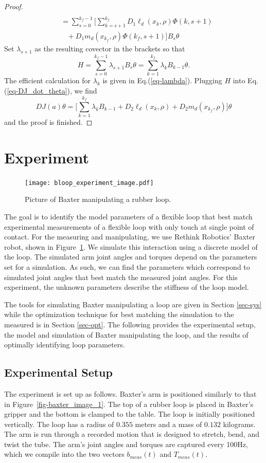 \documentclass[letterpaper, 10pt, conference]{ieeeconf}
\begin{document}
\begin{proof}
\[\begin{array}{l}
\\\hspace{10pt} = \sum_{s=0}^{k_f-1}\Big[\sum_{k = s+1}^{k_f}D_1\ell_d(x_k,\rho) \Phi(k,s+1) \\\hspace{20pt}+ D_1m_d(x_{k_f},\rho)\Phi(k_f,s+1)\Big]B_s\theta
\end{array}
\]
Set $\lambda_{s+1}$ as the resulting covector in the brackets so that 
\[
H = \sum_{s=0}^{k_f-1} \lambda_{s+1} B_s\theta = \sum_{k=1}^{k_f} \lambda_{k} B_{k-1}\theta.
\]
The efficient calculation for $\lambda_k$ is given in Eq.(\ref{eq-lambda}).  Plugging $H$ into Eq.(\ref{eq-DJ_dot_theta}), we find
\[
DJ(a)\theta = \Big[\sum_{k = 1}^{k_f}\lambda_kB_{k-1} +D_2\ell_d(x_k,\rho) + D_2m_d(x_{k_f},\rho)\Big]\theta
\]
and the proof is finished.
\end{proof}

\section{Experiment}
\label{sec-experiment}
\begin{figure}
\centering
\texttt{[image: bloop\_experiment\_image.pdf]}
\caption{Picture of Baxter manipulating a rubber loop.}
\label{fig-bloop_experiment}
\end{figure}

The goal is to identify the model parameters of a flexible loop that best match experimental measurements of a flexible loop with only touch at single point of contact.  For the measuring and manipulating, we use Rethink Robotics' Baxter robot, shown in Figure~\ref{fig-bloop_experiment}. We simulate this interaction using a discrete model of the loop.  The simulated arm joint angles and torques depend on the parameters set for a simulation.  As such, we can find the parameters which correspond to simulated joint angles that best match the measured joint angles.  For this experiment, the unknown parameters describe the stiffness of the loop model.

The tools for simulating Baxter manipulating a loop are given in Section \ref{sec-sys} while the optimization technique for best matching the simulation to the measured is in Section \ref{sec-opt}.  The following provides the experimental setup, the model and simulation of Baxter manipulating the loop, and the results of optimally identifying loop parameters.

\subsection{Experimental Setup \label{sec-setup}}
The experiment is set up as follows.  Baxter's arm is positioned similarly to that in Figure~\ref{fig-baxter_image_1}.  The top of a rubber loop is placed in Baxter's gripper and the bottom is clamped to the table.   The loop is initially positioned vertically. The loop has a radius of $0.355$ meters and a mass of $0.132$ kilograms.  The arm is run through a recorded motion that is designed to stretch, bend, and twist the tube. The arm's joint angles and torques are captured every 100Hz, which we compile into the two vectors $b_{meas}(t)$ and $T_{meas}(t)$.  
\end{document}
